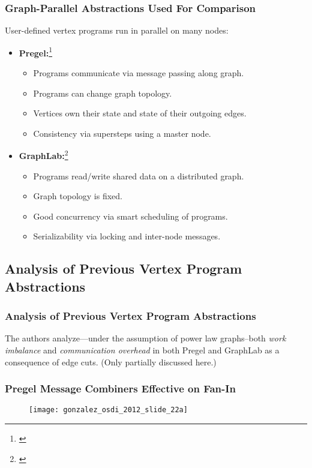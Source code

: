 \begin{frame}
  \frametitle{Graph-Parallel Abstractions Used For Comparison}
  User-defined vertex programs run in parallel on many nodes:
  \begin{itemize}
    \item \textbf{Pregel:}\footnote{\cite[SIGMOD '10]{malewicz2010pregel}}
      \begin{itemize}
        \item Programs communicate via message passing along graph.
        \item Programs can change graph topology.
        \item Vertices own their state and state of their outgoing edges.
        \item Consistency via supersteps using a master node.
      \end{itemize}
    \item \textbf{GraphLab:}\footnote{\cite[VLDB '12]{low2012distributed}}
      \begin{itemize}
        \item Programs read/write shared data on a distributed graph.
        \item Graph topology is fixed.
        \item Good concurrency via smart scheduling of programs.
        \item Serializability via locking and inter-node messages.
      \end{itemize}
  \end{itemize}
\end{frame}


\subsection{Analysis of Previous Vertex Program Abstractions}

\begin{frame}
  \frametitle{Analysis of Previous Vertex Program Abstractions}
  The authors analyze---under the assumption of power law graphs--both
  \textit{work imbalance} and \textit{communication overhead} in both Pregel and
  GraphLab as a consequence of edge cuts. (Only partially discussed here.)
\end{frame}

\begin{frame}
  \frametitle{Pregel Message Combiners Effective on Fan-In}
  \begin{figure}
    \centering
    \texttt{[image: gonzalez\_osdi\_2012\_slide\_22a]}
    \caption{\cite[OSDI '12 Slides]{gonzalez2012powergraph-slides}}
  \end{figure}
\end{frame}

